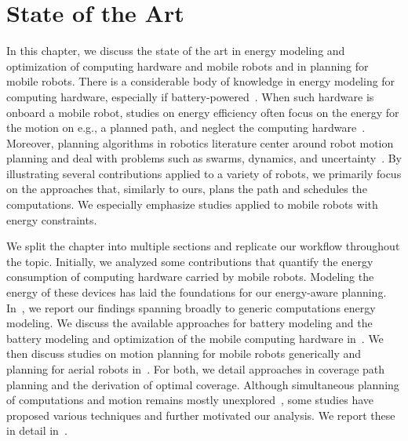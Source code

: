 
\chapter{State of the Art}
\label{cp:soa}

In this chapter, we discuss the state of the art in energy modeling and optimization of computing hardware and mobile robots and in planning for mobile robots. There is a considerable body of knowledge in energy modeling for computing hardware, especially if battery-powered~\citep{rao2005battery}. When such hardware is onboard a mobile robot, studies on energy efficiency often focus on the energy for the motion on e.g., a planned path, and neglect the computing hardware~\citep{ondruska2015scheduled}. Moreover, planning algorithms in robotics literature center around robot motion planning and deal with problems such as swarms, dynamics, and uncertainty~\citep{lavalle2006planning}. By illustrating several contributions applied to a variety of robots, we primarily focus on the approaches that, similarly to ours, plans the path and schedules the computations. We especially emphasize studies applied to mobile robots with energy constraints.

We split the chapter into multiple sections and replicate our workflow throughout the topic. Initially, we analyzed some contributions that quantify the energy consumption of computing hardware carried by mobile robots. Modeling the energy of these devices has laid the foundations for our energy-aware planning. In~, we report our findings spanning broadly to generic computations energy modeling. We discuss the available approaches for battery modeling and the battery modeling and optimization of the mobile computing hardware in~. We then discuss studies on motion planning for mobile robots generically and planning for aerial robots in~. For both, we detail approaches in coverage path planning and the derivation of optimal coverage. Although simultaneous planning of computations and motion remains mostly unexplored~\citep{brateman2006energy,ondruska2015scheduled,sudhakar2020balancing}, some studies have proposed various techniques and further motivated our analysis. We report these in detail in~.

